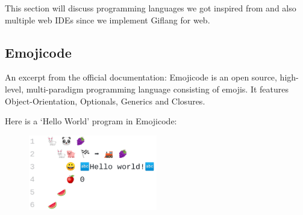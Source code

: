 This section will discuss programming languages we got inspired from and also multiple web IDEs since we implement
Giflang for web.

\subsection{Emojicode}
An excerpt from the official documentation: Emojicode is an open source, high-level, multi-paradigm programming language consisting of emojis.
It features Object-Orientation, Optionals, Generics and Closures.

Here is a `Hello World' program in Emojicode:
\begin{figure}[!hbt]
	\includegraphics[width=0.5\textwidth]{../img/emojicode_helloworld}
	\label{fig:chap1:emojicode_helloworld}
\end{figure}

